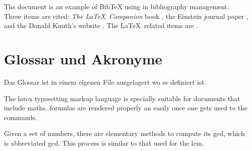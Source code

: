 Ths document is an example of BibTeX using in bibliography management. Three items
are cited: \textit{The \LaTeX\ Companion} book \cite{latexcompanion}, the Einstein
journal paper \cite{einstein}, and the Donald Knuth's website \cite{knuthwebsite}.
The \LaTeX\ related items are \cite{latexcompanion,knuthwebsite}.

\section{Glossar und Akronyme}
Das Glossar ist in einem eigenen File ausgelagert wo es definiert ist.


The \Gls{latex} typesetting markup language is specially suitable
for documents that include \gls{maths}. \Glspl{formula} are
rendered properly an easily once one gets used to the commands.

Given a set of numbers, there are elementary methods to compute
its \acrlong{gcd}, which is abbreviated \acrshort{gcd}. This
process is similar to that used for the \acrfull{lcm}.
